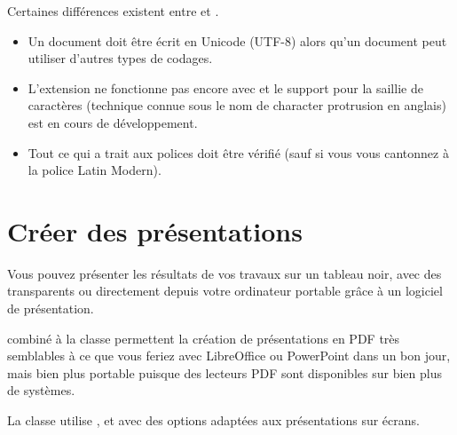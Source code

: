 Certaines différences existent entre  et
.

\begin{itemize}
\item Un document  doit être écrit en Unicode (UTF-8)
  alors qu'un document  peut utiliser d'autres types
  de codages.
\item L'extension  ne fonctionne pas encore avec
   et le support pour la saillie de caractères
  (technique connue sous le nom de \og character protrusion \fg en
  anglais) est en cours de développement.
\item Tout ce qui a trait aux polices doit être vérifié (sauf si vous
  vous cantonnez à la police Latin Modern).
\end{itemize}


\section{Créer des présentations}
\label{sec:beamer}
Vous pouvez présenter les résultats de vos travaux sur un tableau
noir, avec des transparents ou directement depuis votre ordinateur
portable grâce à un logiciel de présentation.

 combiné à la classe  permettent la création
de présentations en PDF très semblables à ce que vous feriez avec
LibreOffice ou PowerPoint dans un bon jour, mais bien plus portable
puisque des lecteurs PDF sont disponibles sur bien plus de systèmes.

La classe  utilise ,  et
 avec des options adaptées aux présentations sur
écrans.



